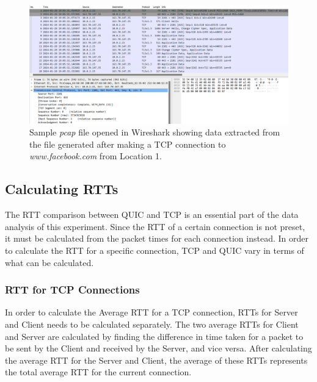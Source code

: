 \documentclass{l4proj}
\begin{document}
\begin{figure}
    \centering
    \includegraphics[width=1\linewidth]{images/wireshark.png}
    \caption{Sample \emph{pcap} file opened in Wireshark showing data extracted from the file generated after making a TCP connection to \emph{www.facebook.com} from Location 1.}
    \label{fig:pcapsample}
\end{figure}



\subsection{Calculating RTTs}

The RTT comparison between QUIC and TCP is an essential part of the data analysis of this experiment. Since the RTT of a certain connection is not preset, it must be calculated from the packet times for each connection instead. In order to calculate the RTT for a specific connection, TCP and QUIC vary in terms of what can be calculated.

\subsubsection{RTT for TCP Connections} In order to calculate the Average RTT for a TCP connection, RTTs for Server and Client needs to be calculated separately. The two average RTTs for Client and Server are calculated by finding the difference in time taken for a packet to be sent by the Client and received by the Server, and vice versa. After calculating the average RTT for the Server and Client, the average of these RTTs represents the total average RTT for the current connection.
\end{document}
